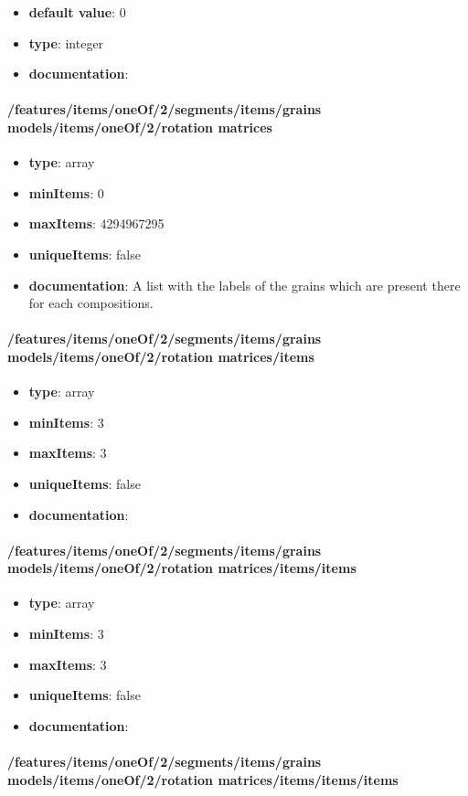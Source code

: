 \begin{itemize}\item {\bf default value}: 0
\item {\bf type}: integer
\item {\bf documentation}: 
\end{itemize}\paragraph{/features/items/oneOf/2/segments/items/grains models/items/oneOf/2/rotation matrices}
\begin{itemize}\item {\bf type}: array
\item {\bf minItems}: 0
\item {\bf maxItems}: 4294967295
\item {\bf uniqueItems}: false
\item {\bf documentation}: A list with the labels of the grains which are present there for each compositions.
\end{itemize}\paragraph{/features/items/oneOf/2/segments/items/grains models/items/oneOf/2/rotation matrices/items}
\begin{itemize}\item {\bf type}: array
\item {\bf minItems}: 3
\item {\bf maxItems}: 3
\item {\bf uniqueItems}: false
\item {\bf documentation}: 
\end{itemize}\paragraph{/features/items/oneOf/2/segments/items/grains models/items/oneOf/2/rotation matrices/items/items}
\begin{itemize}\item {\bf type}: array
\item {\bf minItems}: 3
\item {\bf maxItems}: 3
\item {\bf uniqueItems}: false
\item {\bf documentation}: 
\end{itemize}\paragraph{/features/items/oneOf/2/segments/items/grains models/items/oneOf/2/rotation matrices/items/items/items}
